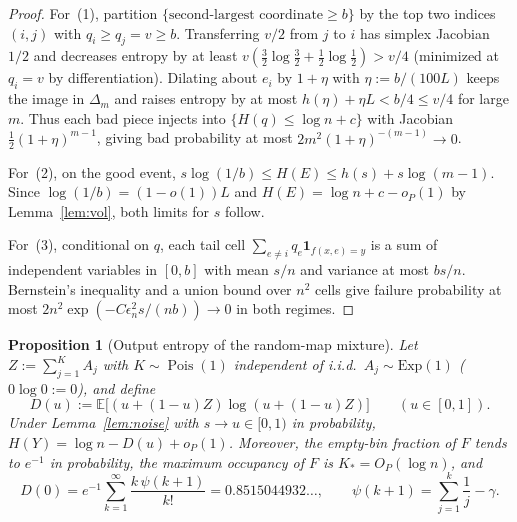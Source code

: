 \documentclass[11pt]{article}
\theoremstyle{plain}
\newtheorem{proposition}[theorem]{Proposition}
\theoremstyle{definition}
\theoremstyle{remark}
\DeclareMathOperator{\Pois}{Pois}
\begin{document}
\begin{proof}
For~(1), partition $\{\text{second-largest coordinate} \ge b\}$ by the top two indices $(i, j)$ with $q_i \ge q_j = v \ge b$. Transferring $v/2$ from $j$ to $i$ has simplex Jacobian $1/2$ and decreases entropy by at least $v(\frac{3}{2}\log\frac{3}{2} + \frac{1}{2}\log\frac{1}{2}) > v/4$ (minimized at $q_i = v$ by differentiation). Dilating about $e_i$ by $1 + \eta$ with $\eta := b / (100 L)$ keeps the image in $\Delta_m$ and raises entropy by at most $h(\eta) + \eta L < b/4 \le v/4$ for large $m$. Thus each bad piece injects into $\{H(q) \le \log n + c\}$ with Jacobian $\frac{1}{2}(1 + \eta)^{m-1}$, giving bad probability at most $2m^2 (1 + \eta)^{-(m-1)} \to 0$.

For~(2), on the good event, $s \log(1/b) \le H(E) \le h(s) + s\log(m-1)$. Since $\log(1/b) = (1 - o(1))L$ and $H(E) = \log n + c - o_P(1)$ by Lemma~\ref{lem:vol}, both limits for $s$ follow.

For~(3), conditional on $q$, each tail cell $\sum_{e \neq i} q_e \mathbf{1}_{f(x,e)=y}$ is a sum of independent variables in $[0, b]$ with mean $s/n$ and variance at most $bs/n$. Bernstein's inequality and a union bound over $n^2$ cells give failure probability at most $2n^2 \exp(-C \epsilon_n^2 s / (nb)) \to 0$ in both regimes.
\end{proof}

\begin{proposition}[Output entropy of the random-map mixture]\label{prop:HY}
Let $Z := \sum_{j=1}^K A_j$ with $K \sim \Pois(1)$ independent of i.i.d.\ $A_j \sim \mathrm{Exp}(1)$ ($0\log 0 := 0$), and define
\[
D(u) := \mathbb{E}\bigl[(u + (1 - u)Z)\log(u + (1 - u)Z)\bigr] \qquad (u \in [0, 1]).
\]
Under Lemma~\ref{lem:noise} with $s \to u \in [0, 1)$ in probability, $H(Y) = \log n - D(u) + o_P(1)$. Moreover, the empty-bin fraction of $F$ tends to $e^{-1}$ in probability, the maximum occupancy of $F$ is $K_* = O_P(\log n)$, and
\[
D(0) = e^{-1}\sum_{k=1}^\infty \frac{k\,\psi(k+1)}{k!} = 0.8515044932\ldots,
\qquad
\psi(k+1) = \sum_{j=1}^k \frac{1}{j} - \gamma.
\]
\end{proposition}
\end{document}
